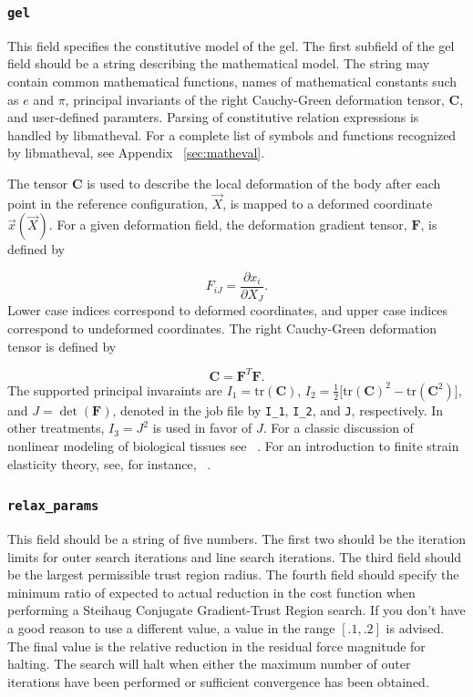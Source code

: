 \documentclass{article}
\begin{document}
\subsubsection*{\texttt{gel}}
This field specifies the constitutive model of the gel. The first subfield
of the gel field should be a string describing the mathematical model. The
string may contain common mathematical functions, names of mathematical
constants such as $e$ and $\pi$, principal invariants of the right Cauchy-Green
deformation tensor, $\mathbf{C}$, and user-defined paramters. Parsing of
constitutive relation expressions is handled by libmatheval. For a complete
list of symbols and functions recognized by libmatheval, see Appendix 
~\ref{sec:matheval}.

The tensor $\mathbf{C}$ is used to describe the local deformation of the
body after each point in the reference configuration, $\vec{X}$, is mapped to
a deformed coordinate $\vec{x}\left(\vec{X}\right)$. For a given deformation
field, the deformation gradient tensor, $\mathbf{F}$, is defined by

\begin{equation}
F_{iJ} = \frac{\partial x_i}{\partial X_J}.
\end{equation}
Lower case indices correspond to deformed coordinates, and upper case indices
correspond to undeformed coordinates. The right Cauchy-Green deformation tensor
is defined by

\begin{equation}
\mathbf{C} = \mathbf{F}^T \mathbf{F}.
\end{equation}
The supported principal invaraints are $I_1 = \text{tr}(\mathbf{C})$,
$I_2 = \frac{1}{2} \Big[\text{tr}\left(\mathbf{C}\right)^2 - \text{tr}\left(\mathbf{C}^2\right) \Big]$, and $J = \det(\mathbf{F})$, denoted in the job file
by \texttt{I\_1}, \texttt{I\_2}, and \texttt{J}, respectively. In other
treatments, $I_3 = J^2$ is used in favor of $J$. For a classic discussion of
nonlinear modeling of biological tissues see ~\cite{fung_biomech}. For an
introduction to finite strain elasticity theory, see, for instance,
~\cite{hackett_primer}.

\subsubsection*{\texttt{relax\_params}}
This field should be a string of five numbers. The first two should be the
iteration limits for outer search iterations and line search iterations. The 
third field should be the largest permissible trust region radius. The fourth
field should specify the minimum ratio of expected to actual reduction in
the cost function when performing a Steihaug Conjugate Gradient-Trust Region
search. If you don't have a good reason to use a different value, a value
in the range $\left[.1,.2\right]$ is advised. The final value is the relative
reduction in the residual force magnitude for halting. The search will halt
when either the maximum number of outer iterations have been performed or
sufficient convergence has been obtained.
\end{document}
